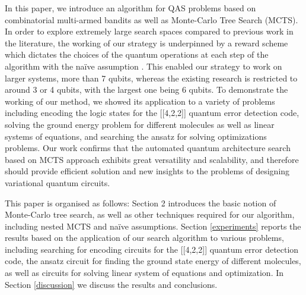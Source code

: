 \documentclass[a4paper,onecolumn,11pt]{quantumarticle}
\begin{document}
In this paper, we introduce an algorithm for QAS problems based on combinatorial multi-armed bandits as well as Monte-Carlo Tree Search (MCTS). In order to explore extremely large search spaces compared to previous work in the literature, the working of our strategy is underpinned by a reward scheme which dictates the choices of the quantum operations at each step of the algorithm with the na\"ive assumption \cite{CMAB_RTS}. This enabled our strategy to work on larger systems, more than 7 qubits, whereas the existing research \cite{zhang2021differentiable, chen2021quantum, kuo2021quantum, zhang2021differentiable, du2020quantum, zhang2021neural} is restricted to around 3 or 4 qubits, with the largest one being 6 qubits. To demonstrate the working of our method, we showed its application to a variety of problems including encoding the logic states for the [[4,2,2]] quantum error detection code, solving the ground energy problem for different molecules as well as linear systems of equations, and searching the ansatz for solving optimizations problems. Our work confirms that the automated quantum architecture search based on MCTS approach exhibits great versatility and scalability, and therefore should provide efficient solution and new insights to the problems of designing variational quantum circuits.

This paper is organised as follows: Section 2 introduces the basic notion of Monte-Carlo tree search, as well as other techniques required for our algorithm, including nested MCTS and na\"ive assumptions. Section \ref{experiments}  reports the results based on the application of our search algorithm to various problems, including searching for encoding circuits for the [[4,2,2]] quantum error detection code, the ansatz circuit for finding the ground state energy of different molecules, as well as circuits for solving linear system of equations and optimization. In Section \ref{discussion} we discuss the results and conclusions.
\end{document}
